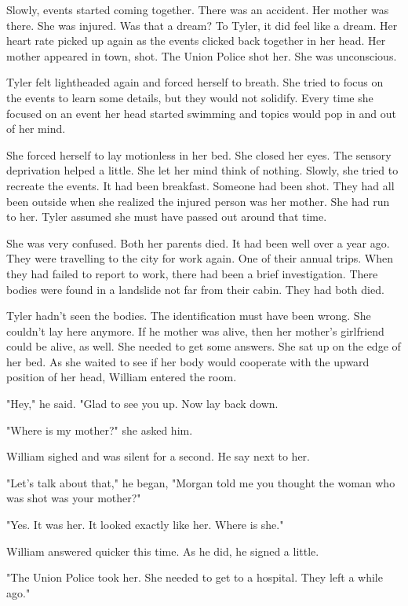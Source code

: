 \documentclass[courier]{sffms}
\begin{document}
Slowly, events started coming together. There
was an accident. Her mother was there. She
was injured. Was that a dream? To Tyler, it
did feel like a dream. Her heart rate picked up
again as the events clicked back together in her
head. Her mother appeared in town, shot. The
Union Police shot her. She was unconscious.

Tyler felt lightheaded again and forced herself
to breath. She tried to focus on the events
to learn some details, but they would not solidify.
Every time she focused on an event her head
started swimming and topics would pop in and
out of her mind.

She forced herself to lay motionless in her bed.
She closed her eyes. The sensory deprivation
helped a little. She let her mind think of nothing.
Slowly, she tried to recreate the events. It had
been breakfast. Someone had been shot. They
had all been outside when she realized the
injured person was her mother. She had run
to her. Tyler assumed she must have passed out
around that time.

She was very confused. Both her parents died.
It had been well over a year ago. They were
travelling to the city for work again. One of their
annual trips. When they had failed to report
to work, there had been a brief investigation.
There bodies were found in a landslide not far
from their cabin. They had both died.

Tyler hadn't seen the bodies. The identification
must have been wrong. She couldn't lay here
anymore. If he mother was alive, then her
mother's girlfriend could be alive, as well. She
needed to get some answers. She sat up on 
the edge of her bed. As she waited to see if
her body would cooperate with the upward
position of her head, William entered the room.

"Hey," he said. "Glad to see you up. Now lay
back down.

"Where is my mother?" she asked him.

William sighed and was silent for a second.
He say next to her.

"Let's talk about that," he began, "Morgan told
me you thought the woman who was shot was
your mother?"

"Yes. It was her. It looked exactly like her. 
Where is she."

William answered quicker this time. As he did,
he signed a little.

"The Union Police took her. She needed to get
to a hospital. They left a while ago."
\end{document}
